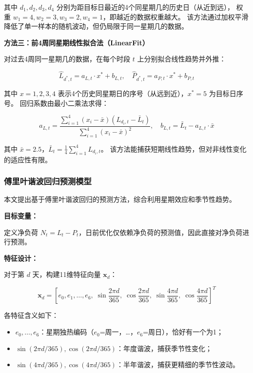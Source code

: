 \documentclass[12pt,a4paper]{article}
\begin{document}
其中 $d_1, d_2, d_3, d_4$ 分别为距目标日最近的4个同星期几的历史日（从近到远），
权重 $w_1=4, w_2=3, w_3=2, w_4=1$，即越近的数据权重越大。
该方法通过加权平滑降低了单一样本的随机波动，但仍局限于同一星期几的数据。

\textbf{方法三：前4周同星期线性拟合法（LinearFit）}

对过去4周同一星期几的数据，在每个时段 $t$ 上分别拟合线性趋势并外推：

\begin{equation}
    \hat{L}_{d^*,t} = a_{L,t} \cdot x^* + b_{L,t}, \quad
    \hat{P}_{d^*,t} = a_{P,t} \cdot x^* + b_{P,t}
\end{equation}

其中 $x = 1, 2, 3, 4$ 表示4个历史同星期日的序号（从远到近），$x^* = 5$ 为目标日序号。
回归系数由最小二乘法求得：

\begin{equation}
    a_{L,t} = \frac{\sum_{i=1}^{4}(x_i - \bar{x})(L_{d_i,t} - \bar{L}_t)}{\sum_{i=1}^{4}(x_i - \bar{x})^2}, \quad
    b_{L,t} = \bar{L}_t - a_{L,t} \cdot \bar{x}
\end{equation}

其中 $\bar{x} = 2.5$，$\bar{L}_t = \frac{1}{4}\sum_{i=1}^{4} L_{d_i,t}$。
该方法能捕获短期线性趋势，但对非线性变化的适应性有限。

\subsubsection{傅里叶谐波回归预测模型}

本文提出基于傅里叶谐波回归的预测方法，综合利用星期效应和季节性趋势。

\textbf{目标变量：}

定义净负荷 $N_t = L_t - P_t$，日前优化仅依赖净负荷的预测值，因此直接对净负荷进行预测。

\textbf{特征设计：}

对于第 $d$ 天，构建11维特征向量 $\mathbf{x}_d$：

\begin{equation}
    \mathbf{x}_d = \left[e_0, e_1, \ldots, e_6,\; \sin\frac{2\pi d}{365},\; \cos\frac{2\pi d}{365},\; \sin\frac{4\pi d}{365},\; \cos\frac{4\pi d}{365}\right]^T
\end{equation}

各特征含义如下：
\begin{itemize}
    \item $e_0, \ldots, e_6$：星期独热编码（$e_0$=周一，\ldots，$e_6$=周日），恰好有一个为1；
    \item $\sin(2\pi d/365), \cos(2\pi d/365)$：年度谐波，捕获季节性变化；
    \item $\sin(4\pi d/365), \cos(4\pi d/365)$：半年谐波，捕获更精细的季节性波动。
\end{itemize}
\end{document}
